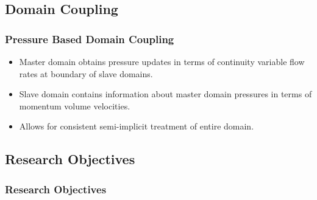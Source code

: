\documentclass[compress,xcolor=table]{beamer}
\begin{document}
\subsection[Domain Coupling]{Domain Coupling}
\begin{frame}
\frametitle{Pressure Based Domain Coupling}

\begin{itemize}
\item{Master domain obtains pressure updates in terms of continuity variable flow rates at boundary of slave domains.}
\item{Slave domain contains information about master domain pressures in terms of momentum volume velocities.}
\item{Allows for consistent semi-implicit treatment of entire domain.}
\end{itemize}

\end{frame}
\subsection[Research Objectives]{Research Objectives}

\begin{frame}
\frametitle{Research Objectives}

\begin{figure}[t]
\centering
\resizebox{!}{0.7\textheight}{

}
\end{figure}

\end{frame}
\end{document}
